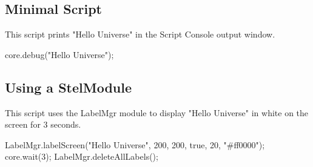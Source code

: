\subsection{Minimal Script}
\label{sec:scripting:MinimalScript}
This script prints "Hello Universe" in the Script Console output window.
\begin{script}
core.debug("Hello Universe");
\end{script}

\subsection{Using a StelModule}
\label{sec:scripting:UsingStelModule}
This script uses the LabelMgr module to display "Hello Universe" in white on the screen for 3 seconds.
\begin{script}
LabelMgr.labelScreen("Hello Universe", 200, 200, true, 20, "#ff0000");
core.wait(3);
LabelMgr.deleteAllLabels();
\end{script}

